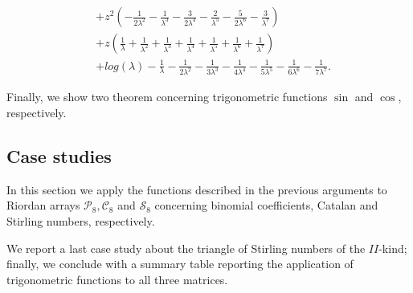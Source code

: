 \begin{remark}
\begin{displaymath}
\begin{split}
&+ z^{2} \left(- \frac{1}{2 \lambda^{2}} - \frac{1}{\lambda^{3}} - \frac{3}{2 \lambda^{4}} - \frac{2}{\lambda^{5}} - \frac{5}{2 \lambda^{6}} - \frac{3}{\lambda^{7}}\right) \\
&+ z \left(\frac{1}{\lambda} + \frac{1}{\lambda^{2}} + \frac{1}{\lambda^{3}} + \frac{1}{\lambda^{4}} + \frac{1}{\lambda^{5}} + \frac{1}{\lambda^{6}} + \frac{1}{\lambda^{7}}\right) \\
&+ log{\left (\lambda \right )} - \frac{1}{\lambda} - \frac{1}{2 \lambda^{2}} - \frac{1}{3 \lambda^{3}} - \frac{1}{4 \lambda^{4}} - \frac{1}{5 \lambda^{5}} - \frac{1}{6 \lambda^{6}} - \frac{1}{7 \lambda^{7}}.
\end{split}
\end{displaymath}
\end{remark}

Finally, we show two theorem concerning trigonometric functions $\sin$ and
$\cos$, respectively.





\subsection{Case studies}

In this section we apply the functions described in the previous arguments to
Riordan arrays $\mathcal{P}_{8}, \mathcal{C}_{8}$ and $\mathcal{S}_{8}$
concerning binomial coefficients, Catalan and Stirling numbers, respectively.







We report a last case study about the triangle of Stirling numbers of the
$II$-kind; finally, we conclude with a summary table reporting the application
of trigonometric functions to all three matrices.




